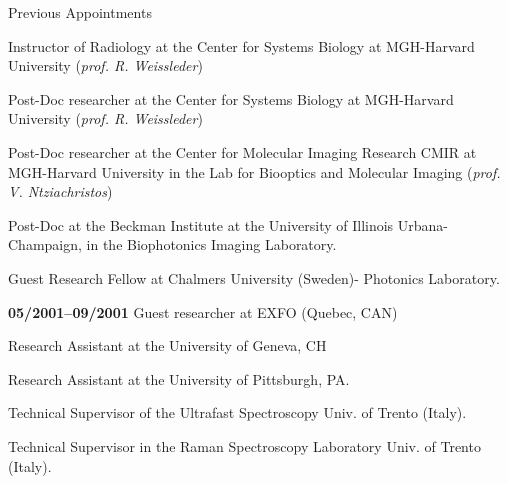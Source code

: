 \documentclass{resume}
\begin{document}
\begin{category}{Previous Appointments}

  Instructor of Radiology at the Center for Systems Biology at MGH-Harvard University ({\em prof. R. Weissleder})

  Post-Doc researcher at the Center for Systems Biology at MGH-Harvard University ({\em prof. R. Weissleder})

  Post-Doc researcher at the Center for Molecular
Imaging Research CMIR at MGH-Harvard University in the Lab for
Biooptics and Molecular Imaging ({\em prof. V. Ntziachristos})

  Post-Doc at the Beckman Institute at the
University of Illinois Urbana-Champaign, in the Biophotonics Imaging
Laboratory.

  Guest Research Fellow at Chalmers University
(Sweden)- Photonics Laboratory.

 \citembullet
 {\bf 05/2001--09/2001} Guest researcher at EXFO (Quebec, CAN)

 Research Assistant at the
University of Geneva, CH

 Research Assistant at the
University of Pittsburgh, PA.

 Technical Supervisor of the
Ultrafast Spectroscopy Univ. of Trento (Italy).

 Technical Supervisor in the Raman
Spectroscopy Laboratory Univ. of Trento (Italy).

\end{category}

\end{document}
